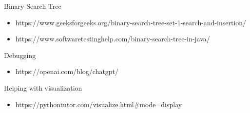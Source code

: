 \documentclass{article}
\begin{document}
Binary Search Tree
    \begin{itemize}
        \item https://www.geeksforgeeks.org/binary-search-tree-set-1-search-and-insertion/
        \item https://www.softwaretestinghelp.com/binary-search-tree-in-java/
    \end{itemize}
        
Debugging
    \begin{itemize}
        \item https://openai.com/blog/chatgpt/ 
    \end{itemize}
    
Helping with visualization 
    \begin{itemize}
        \item https://pythontutor.com/visualize.html#mode=display
    \end{itemize}
\end{document}
